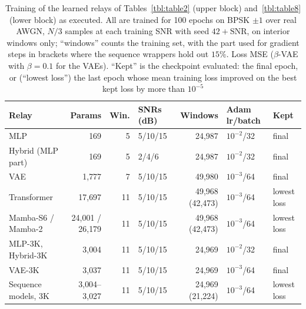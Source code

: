 {\footnotesize\setlength{\tabcolsep}{3pt}\begin{longtable}[]{@{}lrrlrll@{}}
\caption[Training of the canonical learned relays as run]{Training of the learned relays of Tables~\ref{tbl:table2} (upper block) and~\ref{tbl:table8} (lower block) as executed. All are trained for 100 epochs on BPSK $\pm1$ over real AWGN, $N/3$ samples at each training SNR with seed $42+\mathrm{SNR}$, on interior windows only; ``windows'' counts the training set, with the part used for gradient steps in brackets where the sequence wrappers hold out $15\%$. Loss MSE ($\beta$-VAE with $\beta=0.1$ for the VAEs). ``Kept'' is the checkpoint evaluated: the final epoch, or (``lowest loss'') the last epoch whose mean training loss improved on the best kept loss by more than $10^{-5}$ }\label{tbl:canonical-runs}\tabularnewline
\toprule\noalign{}
Relay & Params & Win. & SNRs (dB) & Windows & Adam lr/batch & Kept \\
\midrule\noalign{}
\endfirsthead
\bottomrule\noalign{}
\endlastfoot
MLP & 169 & 5 & 5/10/15 & 24{,}987 & $10^{-2}$/32 & final \\
Hybrid (MLP part) & 169 & 5 & 2/4/6 & 24{,}987 & $10^{-2}$/32 & final \\
VAE & 1{,}777 & 7 & 5/10/15 & 49{,}980 & $10^{-3}$/64 & final \\
Transformer & 17{,}697 & 11 & 5/10/15 & 49{,}968 (42{,}473) & $10^{-3}$/64 & lowest loss \\
Mamba-S6 / Mamba-2 & 24{,}001 / 26{,}179 & 11 & 5/10/15 & 49{,}968 (42{,}473) & $10^{-3}$/64 & lowest loss \\
\midrule\noalign{}
MLP-3K, Hybrid-3K & 3{,}004 & 11 & 5/10/15 & 24{,}969 & $10^{-2}$/32 & final \\
VAE-3K & 3{,}037 & 11 & 5/10/15 & 24{,}969 & $10^{-3}$/64 & final \\
Sequence models, 3K & 3{,}004--3{,}027 & 11 & 5/10/15 & 24{,}969 (21{,}224) & $10^{-3}$/64 & lowest loss \\
\end{longtable}}

